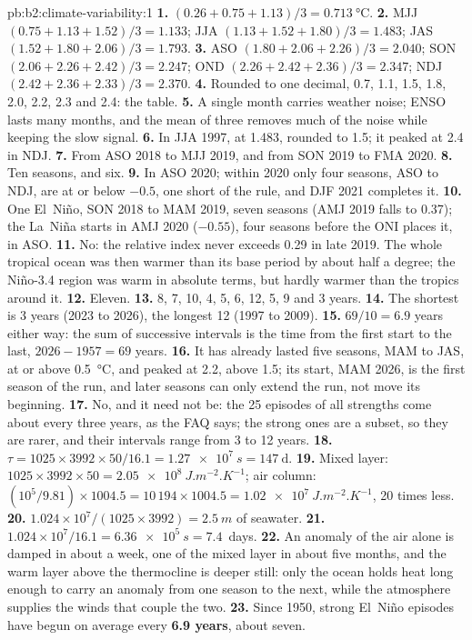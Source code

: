 \begin{solution}{pb:b2:climate-variability:1}
\textbf{1.} $(0.26 + 0.75 + 1.13)/3 = \qty{0.713}{\celsius}$.
\textbf{2.} MJJ $(0.75 + 1.13 + 1.52)/3 = 1.133$; JJA $(1.13 + 1.52 + 1.80)/3 = 1.483$; JAS $(1.52 +
1.80 + 2.06)/3 = 1.793$.
\textbf{3.} ASO $(1.80 + 2.06 + 2.26)/3 = 2.040$; SON $(2.06 + 2.26 + 2.42)/3 = 2.247$; OND $(2.26
+ 2.42 + 2.36)/3 = 2.347$; NDJ $(2.42 + 2.36 + 2.33)/3 = 2.370$.
\textbf{4.} Rounded to one decimal, 0.7, 1.1, 1.5, 1.8, 2.0, 2.2, 2.3 and 2.4: the table.
\textbf{5.} A single month carries weather noise; ENSO lasts many months, and the mean of three
removes much of the noise while keeping the slow signal.
\textbf{6.} In JJA 1997, at 1.483, rounded to 1.5; it peaked at 2.4 in NDJ.
\textbf{7.} From ASO 2018 to MJJ 2019, and from SON 2019 to FMA 2020.
\textbf{8.} Ten seasons, and six.
\textbf{9.} In ASO 2020; within 2020 only four seasons, ASO to NDJ, are at or below $-0.5$, one
short of the rule, and DJF 2021 completes it.
\textbf{10.} One El~Niño, SON 2018 to MAM 2019, seven seasons (AMJ 2019 falls to 0.37); the
La~Niña starts in AMJ 2020 ($-0.55$), four seasons before the ONI places it, in ASO.
\textbf{11.} No: the relative index never exceeds 0.29 in late 2019. The whole tropical ocean was
then warmer than its base period by about half a degree; the Niño-3.4 region was warm in
absolute terms, but hardly warmer than the tropics around it.
\textbf{12.} Eleven.
\textbf{13.} 8, 7, 10, 4, 5, 6, 12, 5, 9 and 3 years.
\textbf{14.} The shortest is 3 years (2023 to 2026), the longest 12 (1997 to 2009).
\textbf{15.} $69/10 = 6.9$ years either way: the sum of successive intervals is the time from the
first start to the last, $2026 - 1957 = 69$ years.
\textbf{16.} It has already lasted five seasons, MAM to JAS, at or above \qty{0.5}{\celsius}, and
peaked at 2.2, above 1.5; its start, MAM 2026, is the first season of the run, and later seasons
can only extend the run, not move its beginning.
\textbf{17.} No, and it need not be: the 25 episodes of all strengths come about every three years, as the FAQ says;
the strong ones are a subset, so they are rarer, and their intervals range from 3 to 12 years.
\textbf{18.} $\tau = 1025 \times 3992 \times 50/16.1 = \qty{1.27e7}{s} = \qty{147}{\day}$.
\textbf{19.} Mixed layer: $1025 \times 3992 \times 50 = \qty{2.05e8}{J.m^{-2}.K^{-1}}$; air column:
$(10^5/9.81) \times 1004.5 = 10\,194 \times 1004.5 = \qty{1.02e7}{J.m^{-2}.K^{-1}}$, 20 times
less.
\textbf{20.} $1.024 \times 10^7/(1025 \times 3992) = \qty{2.5}{m}$ of seawater.
\textbf{21.} $1.024 \times 10^7/16.1 = \qty{6.36e5}{s} = 7.4$~days.
\textbf{22.} An anomaly of the air alone is damped in about a week, one of the mixed layer in
about five months, and the warm layer above the thermocline is deeper still: only the ocean holds
heat long enough to carry an anomaly from one season to the next, while the atmosphere supplies
the winds that couple the two.
\textbf{23.} Since 1950, strong El~Niño episodes have begun on average every \textbf{6.9 years},
about seven.
\end{solution}
